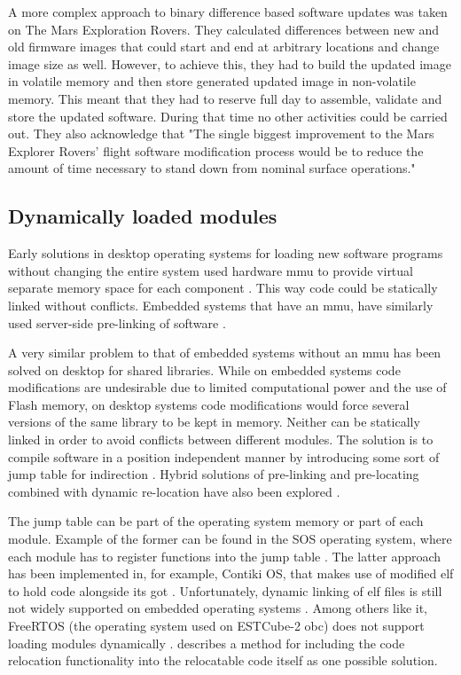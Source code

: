 A more complex approach to binary difference based software updates was taken on The Mars Exploration Rovers. They calculated differences between new and old firmware images that could start and end at arbitrary locations and change image size as well. However, to achieve this, they had to build the updated image in volatile memory and then store generated updated image in non-volatile memory. This meant that they had to reserve full day to assemble, validate and store the updated software. During that time no other activities could be carried out. They also acknowledge that "The single biggest improvement to the Mars Explorer Rovers' flight software modification process would be to reduce the amount of time necessary to stand down from nominal surface operations." \cite{Greco2005}

\subsection{Dynamically loaded modules}

Early solutions in desktop operating systems for loading new software programs without changing the entire system used hardware \gls{mmu} to provide virtual separate memory space for each component . This way code could be statically linked without conflicts. Embedded systems that have an \gls{mmu}, have similarly used server-side pre-linking of software \cite{Shen2010}.

A very similar problem to that of embedded systems without an \gls{mmu} has been solved on desktop for shared libraries. While on embedded systems code modifications are undesirable due to limited computational power and the use of Flash memory, on desktop systems code modifications would force several versions of the same library to be kept in memory. Neither can be statically linked in order to avoid conflicts between different modules. The solution is to compile software in a position independent manner by introducing some sort of jump table for indirection . Hybrid solutions of pre-linking and pre-locating combined with dynamic re-location have also been explored \cite{Dong2009}. 

The jump table can be part of the operating system memory or part of each module. Example of the former can be found in the SOS operating system, where each module has to register functions into the jump table \cite{Han2005}. The latter approach has been implemented in, for example, Contiki OS, that makes use of modified \gls{elf} to hold code alongside its \gls{got} \cite{Dunkels2006}. Unfortunately, dynamic linking of \gls{elf} files is still not widely supported on embedded operating systems \cite{Xinyu2017}. Among others like it, FreeRTOS (the operating system used on ESTCube-2 \gls{obc}) does not support loading modules dynamically \cite{Barry2005}. \citet{Xinyu2017} describes a method for including the code relocation functionality into the relocatable code itself as one possible solution.


